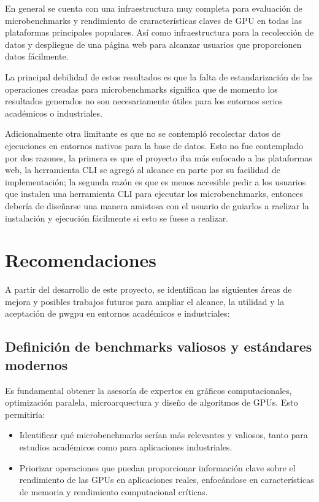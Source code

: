 \documentclass[conference]{IEEEtran}
\begin{document}
En general se cuenta con una infraestructura muy completa para evaluación de
microbenchmarks y rendimiento de craracterísticas claves de GPU en todas las
plataformas principales populares. Así como infraestructura para la recolección
de datos y despliegue de una página web para alcanzar usuarios que proporcionen
datos fácilmente.

La principal debilidad de estos resultados es que la falta de estandarización
de las operaciones creadas para microbenchmarks significa que de momento los
resultados generados no son necesariamente útiles para los entornos serios
académicos o industriales.

Adicionalmente otra limitante es que no se contempló recolectar datos de
ejecuciones en entornos nativos para la base de datos. Esto no fue contemplado
por dos razones, la primera es que el proyecto iba más enfocado a las
plataformas web, la herramienta CLI se agregó al alcance en parte por su
facilidad de implementación; la segunda razón es que es menos accesible pedir a
los usuarios que instalen una herramienta CLI para ejecutar los
microbenchmarks, entonces debería de diseñarse una manera amistosa con el
usuario de guiarlos a raelizar la instalación y ejecución fácilmente si esto se
fuese a realizar.

\section{Recomendaciones}

A partir del desarrollo de este proyecto, se identifican las siguientes áreas
de mejora y posibles trabajos futuros para ampliar el alcance, la utilidad y la
aceptación de µwgpu en entornos académicos e industriales:

\subsection{Definición de benchmarks valiosos y estándares modernos}

Es fundamental obtener la asesoría de expertos en gráficos computacionales,
optimización paralela, microarquectura y diseño de algoritmos de GPUs. Esto permitiría:

\begin{itemize}
    \item Identificar qué microbenchmarks serían más relevantes y valiosos, tanto
      para estudios académicos como para aplicaciones industriales.
    \item Priorizar operaciones que puedan proporcionar información clave sobre
      el rendimiento de las GPUs en aplicaciones reales, enfocándose en
      características de memoria y rendimiento computacional críticas.
\end{itemize}
\end{document}
